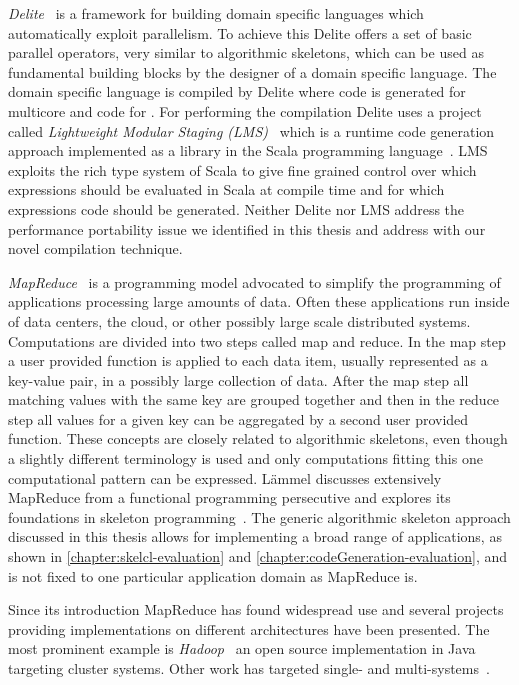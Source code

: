 \emph{Delite}~\cite{ChafiSBLAO11,LeeBSCROO11,BrownSLRCOO11} is a framework for building domain specific languages which automatically exploit parallelism.
To achieve this Delite offers a set of basic parallel operators, very similar to algorithmic skeletons, which can be used as fundamental building blocks by the designer of a domain specific language.
The domain specific language is compiled by Delite where \Cpp code is generated for multicore \CPUs and \CUDA code for \GPUs.
For performing the compilation Delite uses a project called \emph{Lightweight Modular Staging  (LMS)}~\cite{RompfO12} which is a runtime code generation approach implemented as a library in the Scala programming language~\cite{Odersky06,OderskyR14}.
LMS exploits the rich type system of Scala to give fine grained control over which expressions should be evaluated in Scala at compile time and for which expressions code should be generated.
Neither Delite nor LMS address the performance portability issue we identified in this thesis and address with our novel compilation technique.

\bigskip

\emph{MapReduce}~\cite{DeanG04} is a programming model advocated to simplify the programming of applications processing large amounts of data.
Often these applications run inside of data centers, the cloud, or other possibly large scale distributed systems.
Computations are divided into two steps called map and reduce.
In the map step a user provided function is applied to each data item, usually represented as a key-value pair, in a possibly large collection of data.
After the map step all matching values with the same key are grouped together and then in the reduce step all values for a given key can be aggregated by a second user provided function.
These concepts are closely related to algorithmic skeletons, even though a slightly different terminology is used and only computations fitting this one computational pattern can be expressed.
L{\"a}mmel discusses extensively MapReduce from a functional programming persecutive and explores its foundations in skeleton programming~\cite{Laemmel2007}.
The generic algorithmic skeleton approach discussed in this thesis allows for implementing a broad range of applications, as shown in \autoref{chapter:skelcl-evaluation} and \autoref{chapter:codeGeneration-evaluation}, and is not fixed to one particular application domain as MapReduce is.

Since its introduction MapReduce has found widespread use and several projects providing implementations on different architectures have been presented.
The most prominent example is \emph{Hadoop}~\cite{Hadoop} an open source implementation in Java targeting cluster systems.
Other work has targeted single- and multi-\GPU systems~\cite{StuartO11,FangHLG11}.

